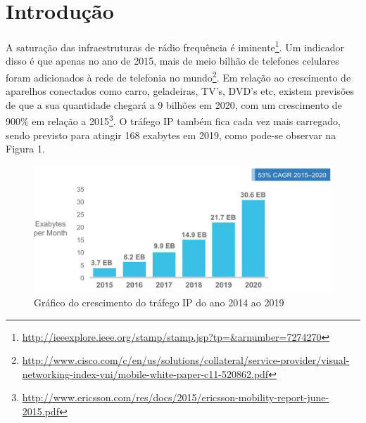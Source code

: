 \documentclass[
12pt,				%
openright,			%
twoside,			%
a4paper,			%
english,			%
french,				%
spanish,			%
brazil,				%
]{abntex2}
\begin{document}
	\tableofcontents*
	\cleardoublepage
	
	
	\textual
	
	\chapter*[Introdução]{Introdução}
	
	A saturação das infraestruturas de rádio frequência é iminente\footnote{\url{http://ieeexplore.ieee.org/stamp/stamp.jsp?tp=&arnumber=7274270}}. Um indicador disso é que apenas no ano de 2015, mais de meio bilhão de telefones celulares foram adicionados à rede de telefonia no mundo\footnote{\url{http://www.cisco.com/c/en/us/solutions/collateral/service-provider/visual-networking-index-vni/mobile-white-paper-c11-520862.pdf}}. Em relação ao crescimento de aparelhos conectados como carro, geladeiras, TV’s, DVD’s etc, existem previsões de que a sua quantidade chegará a 9 bilhões em 2020, com um crescimento de 900\% em relação a 2015\footnote{\url{http://www.ericsson.com/res/docs/2015/ericsson-mobility-report-june-2015.pdf}}. O tráfego IP também fica cada vez mais carregado, sendo previsto para atingir 168 exabytes em 2019, como pode-se observar na Figura 1.
	
	\begin{figure}[!htb]
		\caption{\label{fig_cisco}Gráfico do crescimento do tráfego IP do ano 2014 ao 2019}
		\begin{center}
			\includegraphics[scale=0.5]{cisco_exabytes_per_month.png}
		\end{center}
	\end{figure}
	
\end{document}
